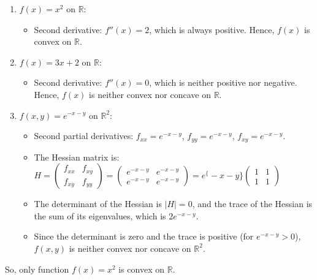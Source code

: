 \documentclass[11pt]{article}
\makeatletter
\providecommand{\tightlist}{%
      \setlength{\itemsep}{0pt}\setlength{\parskip}{0pt}}
\newcommand{\boxspacing}{\kern\kvtcb@left@rule\kern\kvtcb@boxsep}
\newcommand{\prompt}[4]{
        {\ttfamily\llap{{\color{#2}[#3]:\hspace{3pt}#4}}\vspace{-\baselineskip}}
    }
\makeatother
\begin{document}
\begin{enumerate}
\def\labelenumi{\alph{enumi}.}
\tightlist
\item
  $f(x) = x^2$ on $\mathbb{R}$:

  \begin{itemize}
  \tightlist
  \item
    Second derivative: $f''(x) = 2$, which is always positive. Hence,
    $f(x)$ is convex on $\mathbb{R}$.
  \end{itemize}
\item
  $f(x) = 3x + 2$ on $\mathbb{R}$:

  \begin{itemize}
  \tightlist
  \item
    Second derivative: $f''(x) = 0$, which is neither positive nor
    negative. Hence, $f(x)$ is neither convex nor concave on
    $\mathbb{R}$.
  \end{itemize}
\item
  $f(x,y) = e^{-x-y}$ on $\mathbb{R}^2$:

  \begin{itemize}
  \tightlist
  \item
    Second partial derivatives: $f_{xx} = e^{-x-y}$,
    $f_{yy} = e^{-x-y}$, $f_{xy} = e^{-x-y}$.
  \item
    The Hessian matrix is: 
	$ H = \begin{pmatrix} f_{xx} & f_{xy} \\ f_{xy} & f_{yy} \end{pmatrix} = \begin{pmatrix}e^{-x-y} & e^{-x-y} \\ e^{-x-y} & e^{-x-y}\end{pmatrix}= e^\{-x-y\}
    \begin{pmatrix}1 & 1 \\ 1 & 1\end{pmatrix}
    $
  \item
    The determinant of the Hessian is $|H| = 0$, and the trace of the
    Hessian is the sum of its eigenvalues, which is $2e^{-x-y}$.
  \item
    Since the determinant is zero and the trace is positive (for
    $e^{-x-y} > 0$), $f(x,y)$ is neither convex nor concave on
    $\mathbb{R}^2$.
  \end{itemize}
\end{enumerate}

So, only function $f(x) = x^2$ is convex on $\mathbb{R}$.

    \begin{tcolorbox}[breakable, size=fbox, boxrule=1pt, pad at break*=1mm,colback=cellbackground, colframe=cellborder]
\prompt{In}{incolor}{ }{\boxspacing}
\begin{Verbatim}[commandchars=\\\{\}]

\end{Verbatim}
\end{tcolorbox}
\end{document}

